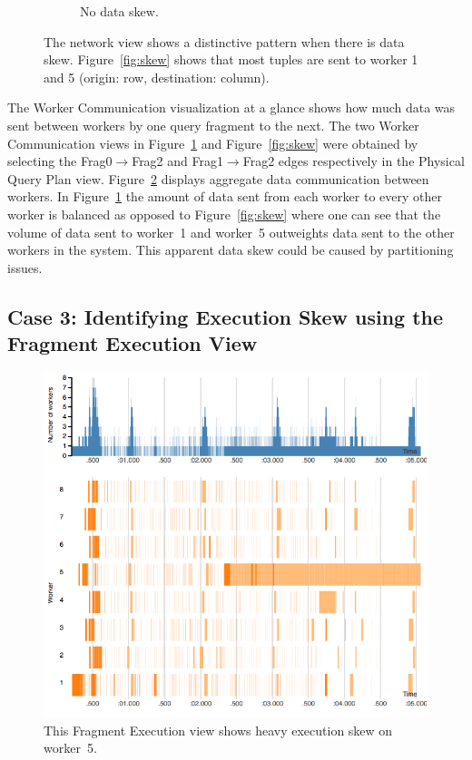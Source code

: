 \documentclass{chi2009}
\newcommand*{\graph}{Physical Query Plan\xspace}
\newcommand*{\fragment}{Fragment Execution\xspace}
\newcommand*{\network}{Worker Communication\xspace}
\begin{document}
\begin{figure}[ht]
\begin{subfigure}[b]{0.49\columnwidth}
    \caption{No data skew.}
    \label{fig:no-skew}
  \end{subfigure}
  \caption{The network view shows a distinctive pattern when there is data skew. Figure~\ref{fig:skew} shows that most tuples are sent to worker 1 and 5 (origin: row, destination: column).}
  \label{fig:network}
\end{figure}

The \network visualization at a glance shows how much data was sent between workers by one query fragment to the next. The two \network views in Figure~\ref{fig:no-skew} and Figure~\ref{fig:skew} were obtained by selecting the Frag0$\rightarrow$Frag2 and Frag1$\rightarrow$Frag2 edges respectively in the \graph view. Figure~\ref{fig:network} displays aggregate data communication between workers. In Figure~\ref{fig:no-skew} the amount of data sent from each worker to every other worker is balanced as opposed to Figure~\ref{fig:skew} where one can see that the volume of data sent to worker~1 and worker~5 outweights data sent to the other workers in the system. This apparent data skew could be caused by partitioning issues.

\subsection{Case 3: Identifying Execution Skew using the \fragment View}

\begin{figure}[ht]
  \includegraphics[width=\columnwidth]{images/execution_skew}
  \caption{This \fragment view shows heavy execution skew on worker~5.}
  \label{fig:exec_skew}
\end{figure}
\end{document}

